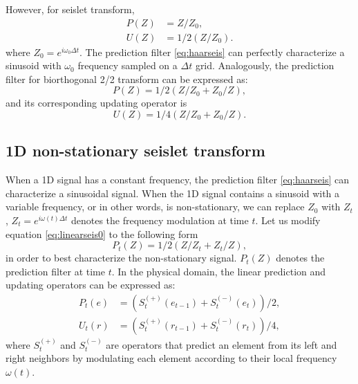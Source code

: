 However, for  seislet transform,
\begin{align}
\label{eq:haarseis}
P(Z)&=Z/Z_0, \\
\label{eq:haarseisu}
U(Z)&=1/2(Z/Z_0).
\end{align}
where $Z_0=e^{i\omega_0\Delta t}$. The prediction filter  \ref{eq:haarseis} can perfectly characterize a sinusoid with $\omega_0$  frequency sampled on a $\Delta t$ grid.
Analogously, the prediction filter for biorthogonal 2/2 transform can be expressed as:
\begin{equation}
\label{eq:linearseis0}
P(Z)=1/2(Z/Z_0+Z_0/Z),
\end{equation}
and its corresponding updating operator is
\begin{equation}
\label{eq:uplinearseis0}
U(Z)=1/4(Z/Z_0+Z_0/Z).
\end{equation}

\subsection{1D non-stationary seislet transform}
When a 1D signal has a constant  frequency, the prediction filter  \ref{eq:haarseis} can characterize a sinusoidal signal. When the 1D signal contains a sinusoid with a variable frequency, or in other words, is non-stationary, we can replace $Z_0$ with $Z_t$,  $Z_t=e^{i\omega(t)\Delta t}$ denotes the frequency modulation at time $t$. Let us modify equation \ref{eq:linearseis0} to the following form\new{:}
\begin{equation}
\label{eq:linearseis}
P_t(Z) = 1/2(Z/Z_t + Z_t/Z),
\end{equation}
in order to best characterize the non-stationary signal. $P_t(Z)$ denotes the prediction filter at time $t$. In the physical domain, the linear prediction and updating operators can be expressed as:
\begin{align}
\label{eq:linearseis-phy}
P_t(e)&=(S_t^{(+)}(e_{t-1}) + S_t^{(-)}(e_t))/2,\\
\label{eq:linearseisu-phy}
U_t(r)&=(S_t^{(+)}(r_{t-1}) + S_t^{(-)}(r_t))/4,
\end{align}
where $S_t^{(+)}$ and $S_t^{(-)}$ are operators that predict an element from its left and right neighbors by modulating each element according to their local frequency $\omega(t)$.

